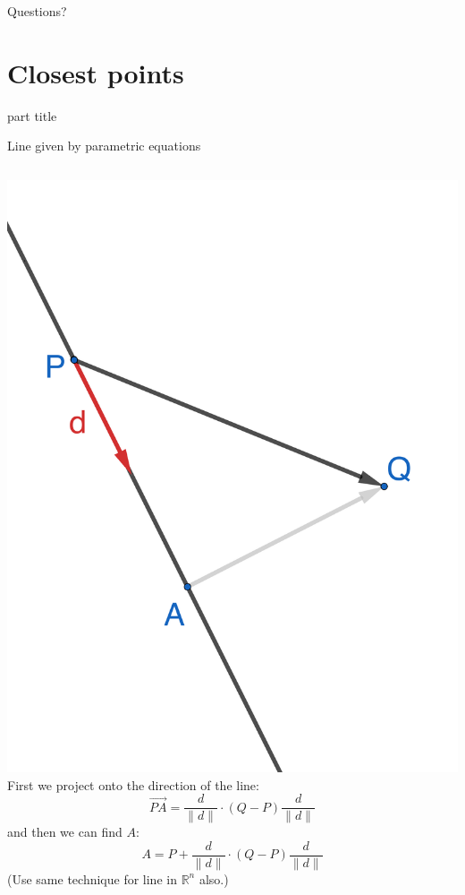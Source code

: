 \documentclass{beamer}
\begin{document}
\begin{frame}
  Questions?
\end{frame}

\section{Closest points}

\begin{frame}
\begin{beamercolorbox}[sep=12pt,center]{part title}
\insertsection\par
\end{beamercolorbox}
\end{frame}

\begin{frame}{Line given by parametric equations}
    \begin{columns}
        \hspace{-1cm}
        \includegraphics[scale=0.6]{2d-parametric-closest.png}
        First we project onto the direction of the line:
        \begin{equation*}
            \overrightarrow {PA} = \frac{d}{\|d\|}\cdot (Q-P)\frac{d}{\|d\|}
        \end{equation*}
        and then we can find $A$:
        \begin{equation*}
            A = P + \frac{d}{\|d\|}\cdot (Q-P)\frac{d}{\|d\|}
        \end{equation*}
        (Use same technique for line in $\mathbb R^n$ also.)
    \end{columns}
\end{frame}
\end{document}
